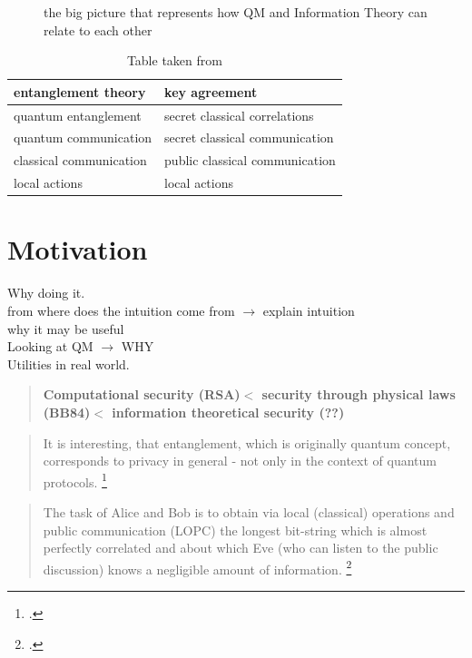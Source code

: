 

	\begin{figure}[H]
		\centering
		
		\caption{the big picture that represents how QM and Information Theory can relate to each other}
	\end{figure}
	\begin{table}[ht]
	 \centering
	 	\begin{tabular}{ l | l}
	 		\textbf{entanglement theory} & \textbf{key agreement} \\ 
	 		\hline 
	 		quantum entanglement & secret classical correlations \\ 
	 		quantum communication & secret classical communication \\ 
	 		classical communication & public classical communication \\ 
	 		local actions & local actions \\ 
	 	\end{tabular} 
	 	\caption{Table taken from \cite{4H07}}
	 \end{table}
	
	
	\section{Motivation}
	Why doing it. \\
	from where does the intuition come from $\rightarrow$ explain intuition\\
	why it may be useful\\
	Looking at QM $\rightarrow$ WHY\\
	Utilities in real world.\\
	
	\begin{quote}
	\textbf{Computational security (RSA)$<$ security through physical laws (BB84)$<$ information theoretical security (??)}
	\end{quote}
	
	\begin{quotation}
	It is interesting, that entanglement, which is originally quantum concept, corresponds to privacy in general - not only in the context of quantum protocols.
	\footcite{4H07}
	\end{quotation}
	\begin{quotation}
	The task of Alice and Bob is to obtain via local (classical) operations and public communication (LOPC) the longest bit-string which is almost perfectly correlated and about which Eve (who can listen to the public discussion) knows a negligible amount of information.
	\footcite{4H07}
	\end{quotation}		
	
